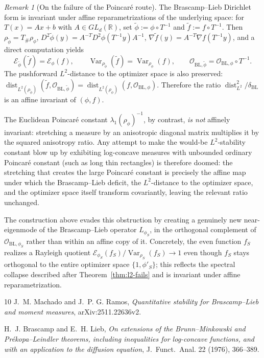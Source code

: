 \documentclass{article}
\theoremstyle{remark}
\newtheorem{remark}[theorem]{Remark}
\DeclareMathOperator{\Var}{Var}
\DeclareMathOperator{\dist}{dist}
\begin{document}
\begin{remark}[On the failure of the Poincar\'e route]\label{rem:affine}
The Brascamp--Lieb Dirichlet form is invariant under affine reparametrizations
of the underlying space: for $T(x)=Ax+b$ with $A\in GL_d(\mathbb R)$, set
$\widetilde\phi:=\phi\circ T^{-1}$ and $\widetilde f:=f\circ T^{-1}$. Then
$\rho_{\widetilde\phi}=T_\#\rho_\phi$, $D^2\widetilde\phi(y)=
A^{-T}D^2\phi(T^{-1}y)A^{-1}$, $\nabla\widetilde f(y)=A^{-T}\nabla f(T^{-1}y)$,
and a direct computation yields
\[
  \mathcal E_{\widetilde\phi}(\widetilde f)=\mathcal E_\phi(f),\qquad
  \Var_{\rho_{\widetilde\phi}}(\widetilde f)=\Var_{\rho_\phi}(f),\qquad
  \mathcal O_{\mathrm{BL},\widetilde\phi}=\mathcal O_{\mathrm{BL},\phi}\circ T^{-1}.
\]
The pushforward $L^2$-distance to the optimizer space is also preserved:
$\dist_{L^2(\rho_{\widetilde\phi})}(\widetilde f,\mathcal O_{\mathrm{BL},
\widetilde\phi})=\dist_{L^2(\rho_\phi)}(f,\mathcal O_{\mathrm{BL},\phi})$.
Therefore the ratio
$\dist_{L^2}^2/\delta_{\mathrm{BL}}$ is an affine invariant of $(\phi,f)$.

The Euclidean Poincar\'e constant $\lambda_1(\rho_\phi)^{-1}$, by contrast,
\emph{is not} affinely invariant: stretching a measure by an anisotropic
diagonal matrix multiplies it by the squared anisotropy ratio. Any attempt to
make the would-be $L^2$-stability constant blow up by exhibiting log-concave
measures with unbounded ordinary Poincar\'e constant (such as long thin
rectangles) is therefore doomed: the stretching that creates the large
Poincar\'e constant is precisely the affine map under which the
Brascamp--Lieb deficit, the $L^2$-distance to the optimizer space, and the
optimizer space itself transform covariantly, leaving the relevant ratio
unchanged.

The construction above evades this obstruction by creating a genuinely new
near-eigenmode of the Brascamp--Lieb operator $L_{\phi_S}$, in the orthogonal
complement of $\mathcal O_{\mathrm{BL},\phi_S}$ rather than within an affine
copy of it. Concretely, the even function $f_S$ realizes a Rayleigh quotient
$\mathcal E_{\phi_S}(f_S)/\Var_{\rho_S}(f_S)\to 1$ even though $f_S$ stays
orthogonal to the entire optimizer space $\{1,\phi'_S\}$; this reflects the
spectral collapse described after Theorem~\ref{thm:l2-fails} and is invariant
under affine reparametrization.
\end{remark}

\begin{thebibliography}{10}
J.~M. Machado and J.~P. G. Ramos,
\textit{Quantitative stability for Brascamp--Lieb and moment measures},
arXiv:2511.22636v2.

H.~J. Brascamp and E.~H. Lieb,
\textit{On extensions of the Brunn--Minkowski and Pr\'ekopa--Leindler theorems,
including inequalities for log-concave functions, and with an application to
the diffusion equation},
J.~Funct.~Anal. 22 (1976), 366--389.
\end{thebibliography}
\end{document}
